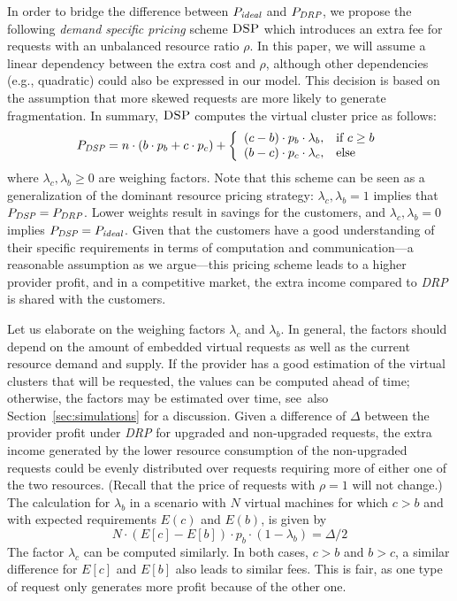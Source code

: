 \documentclass{sig-alternate-per}
\newcommand{\pricing}{\textsc{DSP}}
\begin{document}
In order to bridge the difference between $P_{\emph{ideal}}$ and $P_{\emph{DRP}}$,
we propose the following
\emph{demand specific pricing} scheme
$\pricing$ which introduces an extra fee for requests with an unbalanced resource ratio $\rho$.
In this paper, we will assume a linear dependency between the extra cost and $\rho$, although other dependencies (e.g.,
quadratic) could
also be expressed in our model. This decision is based on the assumption that more skewed requests are more likely to
generate fragmentation. In summary, $\pricing$ computes the virtual cluster price as follows:
 $$P_{\emph{DSP}}= n\cdot (b \cdot p_b + c \cdot p_c) + \left\{\begin{array}{cl}
(c-b)\cdot p_b \cdot \lambda_b, & \mbox{if }c\geq b\\ (b-c)\cdot p_c \cdot \lambda_c, & \mbox{else} \end{array}\right.$$
\noindent where $\lambda_c, \lambda_b\geq 0$ are weighing factors.
Note that this scheme can be seen as a generalization of the dominant resource pricing strategy:
$\lambda_c,\lambda_b=1$ implies that $P_{\emph{DSP}}=P_{\emph{DRP}}$.
Lower weights result in savings for the customers, and $\lambda_c,\lambda_b=0$ implies
$P_{\emph{DSP}}=P_{\emph{ideal}}$.
Given that
the customers have a good understanding of their specific requirements in terms of computation and
communication---a reasonable assumption as we argue---this pricing scheme leads to a higher provider profit, and in a
competitive market,
the extra income compared to \emph{DRP}
is shared with the customers.

Let us elaborate on the weighing factors $\lambda_c$ and $\lambda_b$.
In general, the factors should depend on the amount of embedded virtual requests as well as the current resource demand
and supply.
If the provider has a good estimation of the virtual clusters that will be requested,
the values can be computed ahead of time; otherwise, the factors may be estimated over time, see~also
Section~\ref{sec:simulations}
for a discussion.
Given a difference of $\Delta$ between the provider profit under \emph{DRP} for upgraded and non-upgraded
requests, the extra income generated by the lower resource consumption of the non-upgraded requests could be evenly
distributed over requests requiring more of either one of the two resources.
(Recall that the price of requests with $\rho=1$ will not change.)
The calculation for $\lambda_b$ in a scenario with $N$ virtual machines for which $c>b$ and with
expected
requirements $E(c)$ and $E(b)$, is given by
$$N \cdot (E[c]-E[b]) \cdot p_b \cdot (1-\lambda_b) = \Delta/2$$
\noindent The factor $\lambda_c$ can be computed similarly.
In both cases, $c>b$ and $b>c$, a similar difference for $E[c]$ and $E[b]$ also leads
to similar fees. This is fair, as one type of request only generates more
profit because of the other one.
\end{document}
